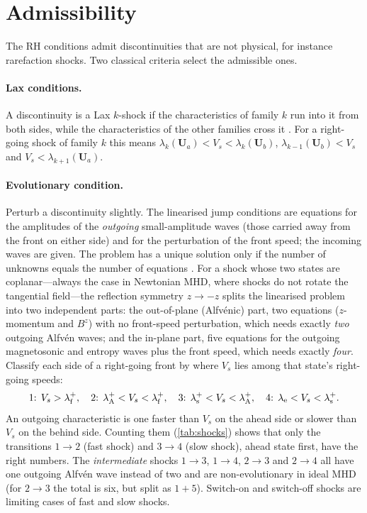 \documentclass[11pt,a4paper,oneside,openany]{book}
\newcommand{\parencite}{\citep}
\theoremstyle{definition}
\theoremstyle{plain}
\theoremstyle{remark}
\newcommand{\UU}{\bm{U}}
\begin{document}
\section{Admissibility}\label{sec:admissibility}

The RH conditions admit discontinuities that are not physical, for instance rarefaction
shocks. Two classical criteria select the admissible ones.

\paragraph{Lax conditions.} A discontinuity is a Lax $k$-shock if the characteristics of
family $k$ run into it from both sides, while the characteristics of the other families
cross it \parencite{Lax1957}. For a right-going shock of family $k$ this means
$\lambda_k(\UU_a)<V_s<\lambda_k(\UU_b)$, $\lambda_{k-1}(\UU_b)<V_s$ and
$V_s<\lambda_{k+1}(\UU_a)$.

\paragraph{Evolutionary condition.} Perturb a discontinuity slightly. The linearised jump
conditions are equations for the amplitudes of the \emph{outgoing} small-amplitude waves
(those carried away from the front on either side) and for the perturbation of the front
speed; the incoming waves are given. The problem has a unique solution only if the number
of unknowns equals the number of equations \parencite{JeffreyTaniuti1964,FalleKomissarov2001}.
For a shock whose two states are coplanar---always the case in Newtonian MHD, where
shocks do not rotate the tangential field---the reflection symmetry $z\to-z$ splits the
linearised problem into two independent parts: the out-of-plane (Alfvénic) part, two
equations ($z$-momentum and $B^z$) with no front-speed perturbation, which needs exactly
\emph{two} outgoing Alfvén waves; and the in-plane part, five equations for the outgoing
magnetosonic and entropy waves plus the front speed, which needs exactly \emph{four}.
Classify each side of a right-going front by where $V_s$ lies among that state's
right-going speeds:
\begin{equation}
\text{1: }V_s>\lambda_{\rm f}^+,\quad
\text{2: }\lambda_{\rm A}^+<V_s<\lambda_{\rm f}^+,\quad
\text{3: }\lambda_{\rm s}^+<V_s<\lambda_{\rm A}^+,\quad
\text{4: }\lambda_{\rm e}<V_s<\lambda_{\rm s}^+ .
\end{equation}
An outgoing characteristic is one faster than $V_s$ on the ahead side or slower than $V_s$
on the behind side. Counting them (\cref{tab:shocks}) shows that only the transitions
$1\to2$ (fast shock) and $3\to4$ (slow shock), ahead state first, have the right numbers.
The \emph{intermediate} shocks $1\to3$, $1\to4$, $2\to3$ and $2\to4$ all have one outgoing
Alfvén wave instead of two and are non-evolutionary in ideal MHD (for $2\to3$ the total
is six, but split as $1+5$). Switch-on and switch-off shocks are limiting cases of fast and
slow shocks.
\end{document}
